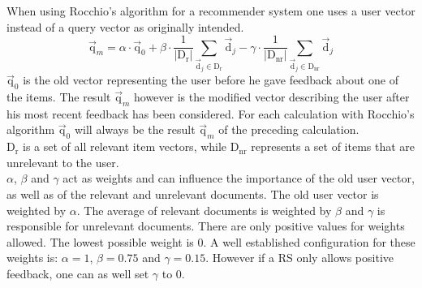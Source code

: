 When using Rocchio's algorithm for a recommender system one uses a user vector instead of a query vector as originally intended.
\begin{equation}
    \vec{\text{q}}_m =
        \alpha \cdot \vec{\text{q}}_0
        + \beta \cdot \frac{1}{|\text{D}_\text{r}|}\sum_{\vec{\text{d}}_j\in \text{D}_\text{r}} \vec{\text{d}}_j
        - \gamma \cdot \frac{1}{|\text{D}_\text{nr}|}\sum_{\vec{\text{d}}_j\in \text{D}_\text{nr}} \vec{\text{d}}_j
\end{equation}
$\vec{\text{q}}_0$ is the old vector representing the user before he gave feedback about one of the items.
The result $\vec{\text{q}}_m$ however is the modified vector describing the user after his most recent feedback has been considered.
For each calculation with Rocchio's algorithm $\vec{\text{q}}_0$ will always be the result $\vec{\text{q}}_m$ of the preceding calculation.\\
$\text{D}_\text{r}$ is a set of all relevant item vectors, while $\text{D}_\text{nr}$ represents a set of items that are unrelevant to the user.\\
$\alpha$, $\beta$ and $\gamma$ act as weights and can influence the importance of the old user vector, as well as of  the relevant and unrelevant documents.
The old user vector is weighted by $\alpha$.
The average of relevant documents is weighted by $\beta$ and $\gamma$ is responsible for unrelevant documents.
There are only positive values for weights allowed.
The lowest possible weight is 0.
A well established configuration for these weights is: $\alpha = 1$, $\beta = 0.75$ and $\gamma = 0.15$.
However if a RS only allows positive feedback, one can as well set $\gamma$ to 0.
\citep[p.~178-183]{manning:2009}
